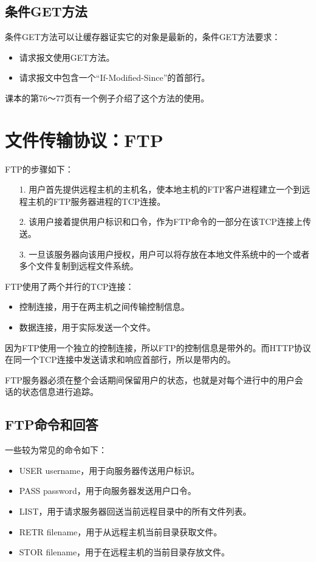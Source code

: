 \documentclass[a4paper,left=2.5cm,right=2.5cm,11pt]{article}
\begin{document}
\subsection{条件GET方法}
	条件GET方法可以让缓存器证实它的对象是最新的，条件GET方法要求：
	\begin{itemize}
		\item 请求报文使用GET方法。
		\item 请求报文中包含一个“If-Modified-Since”的首部行。
	\end{itemize}

	课本的第76～77页有一个例子介绍了这个方法的使用。

\section{文件传输协议：FTP}
	FTP的步骤如下：
	\begin{itemize}
		\item[1.] 用户首先提供远程主机的主机名，使本地主机的FTP客户进程建立一个到远程主机的FTP服务器进程的TCP连接。
		\item[2.] 该用户接着提供用户标识和口令，作为FTP命令的一部分在该TCP连接上传送。
		\item[3.] 一旦该服务器向该用户授权，用户可以将存放在本地文件系统中的一个或者多个文件复制到远程文件系统。
	\end{itemize}

	FTP使用了两个并行的TCP连接：
	\begin{itemize}
		\item 控制连接，用于在两主机之间传输控制信息。
		\item 数据连接，用于实际发送一个文件。
	\end{itemize}

	因为FTP使用一个独立的控制连接，所以FTP的控制信息是带外的。而HTTP协议在同一个TCP连接中发送请求和响应首部行，所以是带内的。\par

	FTP服务器必须在整个会话期间保留用户的状态，也就是对每个进行中的用户会话的状态信息进行追踪。

\subsection{FTP命令和回答}
	一些较为常见的命令如下：
	\begin{itemize}
		\item USER username，用于向服务器传送用户标识。
		\item PASS password，用于向服务器发送用户口令。
		\item LIST，用于请求服务器回送当前远程目录中的所有文件列表。
		\item RETR filename，用于从远程主机当前目录获取文件。
		\item STOR filename，用于在远程主机的当前目录存放文件。
	\end{itemize}
\end{document}
